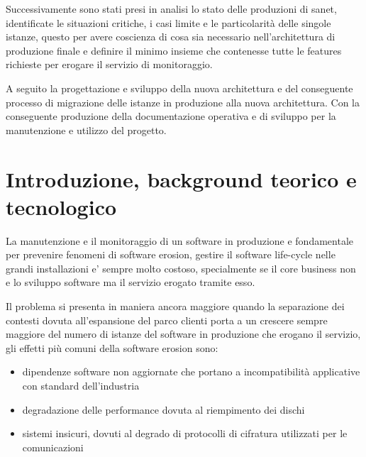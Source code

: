 \documentclass[12pt,a4paper,twoside,openright]{book}
\begin{document}
Successivamente sono stati presi in analisi lo stato delle produzioni di sanet, identificate le situazioni critiche, i casi limite e le particolarità delle singole istanze, questo per avere coscienza di cosa sia necessario nell'architettura di produzione finale e definire il minimo insieme che contenesse tutte le features richieste per erogare il servizio di monitoraggio.

A seguito la progettazione e sviluppo della nuova architettura e del conseguente processo di migrazione delle istanze in produzione alla nuova architettura. Con la conseguente produzione della documentazione operativa e di sviluppo per la manutenzione e utilizzo del progetto.

\newpage

\tableofcontents

\newpage

\listoffigures

\mainmatter

\pagestyle{fancy}
\fancyhead[LO]{\nouppercase{\rightmark}}
\fancyhead[RE]{\nouppercase{\leftmark}}
\fancyhead[LE,RO]{\thepage}
\fancyfoot{}

\chapter{Introduzione, background teorico e tecnologico}

La manutenzione e il monitoraggio di un software in produzione e fondamentale per prevenire fenomeni di software erosion, gestire il software life-cycle nelle grandi installazioni e' sempre molto costoso, specialmente se il core business non e lo sviluppo software ma il servizio erogato tramite esso.

Il problema si presenta in maniera ancora maggiore quando la separazione dei contesti dovuta all'espansione del parco clienti porta a un crescere sempre maggiore del numero di istanze del software in produzione che erogano il servizio, gli effetti più comuni della software erosion sono:

\begin{itemize}
    \item dipendenze software non aggiornate che portano a incompatibilità applicative con standard dell'industria
    \item degradazione delle performance dovuta al riempimento dei dischi
    \item sistemi insicuri, dovuti al degrado di protocolli di cifratura utilizzati per le comunicazioni
\end{itemize}
\end{document}
